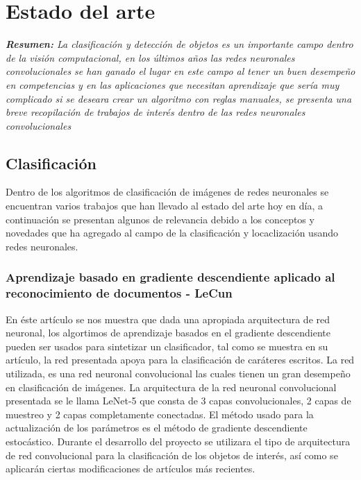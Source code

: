 \chapter{Estado del arte}
\textit{\textbf{Resumen:} La clasificación y detección de objetos es un importante campo dentro de la visión computacional, en los últimos años las redes neuronales convolucionales se han ganado el lugar en este campo al tener un buen desempeño en competencias y en las aplicaciones que necesitan aprendizaje que sería muy complicado si se deseara crear un algoritmo con reglas manuales, se presenta una breve recopilación de trabajos de interés dentro de las redes neuronales convolucionales}

\section{Clasificación}
Dentro de los algoritmos de clasificación de imágenes de redes neuronales se encuentran varios trabajos que han llevado al estado del arte hoy en día, a continuación se presentan algunos de relevancia debido a los conceptos y novedades que ha agregado al campo de la clasificación y locaclización usando redes neuronales.

\subsection{Aprendizaje basado en gradiente descendiente aplicado al reconocimiento de documentos - LeCun}
En éste artículo se nos muestra que dada una apropiada arquitectura de red neuronal, los algortimos de aprendizaje basados en el gradiente descendiente pueden ser usados para sintetizar un clasificador, tal como se muestra en su artículo, la red presentada apoya para la clasificación de caráteres escritos.
La red utilizada, es una red neuronal convolucional las cuales tienen un gran desempeño en clasificación de imágenes. La arquitectura de la red neuronal convolucional presentada se le llama LeNet-5 que consta de 3 capas convolucionales, 2 capas de muestreo y 2 capas completamente conectadas. El método usado para la actualización de los parámetros es el método de gradiente descendiente estocástico.
Durante el desarrollo del proyecto se utilizara el tipo de arquitectura de red convolucional para la clasificación de los objetos de interés, así como se aplicarán ciertas modificaciones de artículos más recientes.


